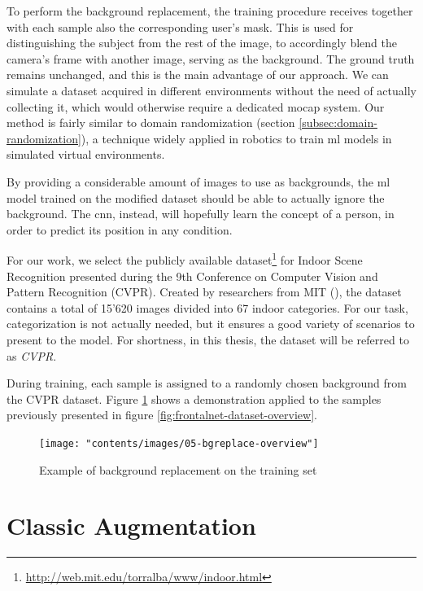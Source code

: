 To perform the background replacement, the training procedure receives together with each sample also the corresponding user's mask. This is used for distinguishing the subject from the rest of the image, to accordingly blend the camera's frame with another image, serving as the background. The ground truth remains unchanged, and this is the main advantage of our approach. We can simulate a dataset acquired in different environments without the need of actually collecting it, which would otherwise require a dedicated \gls{mocap} system. Our method is fairly similar to domain randomization (section \ref{subsec:domain-randomization}), a technique widely applied in robotics to train \gls{ml} models in simulated virtual environments.

By providing a considerable amount of images to use as backgrounds, the \gls{ml} model trained on the modified dataset should be able to actually ignore the background. The \gls{cnn}, instead, will hopefully learn the concept of a person, in order to predict its position in any condition.

\medskip

For our work, we select the publicly available dataset\footnote{\url{http://web.mit.edu/torralba/www/indoor.html}} for Indoor Scene Recognition presented during the 9th Conference on Computer Vision and Pattern Recognition (CVPR). Created by researchers from MIT (\cite{cvpr09}), the dataset contains a total of 15'620 images divided into 67 indoor categories. For our task, categorization is not actually needed, but it ensures a good variety of scenarios to present to the model. For shortness, in this thesis, the dataset will be referred to as \textit{CVPR}.

During training, each sample is assigned to a randomly chosen background from the CVPR dataset. Figure \ref{fig:bgreplace-example} shows a demonstration applied to the samples previously presented in figure \ref{fig:frontalnet-dataset-overview}. 

\begin{figure}[!h]
	\centering
	\texttt{[image: "contents/images/05-bgreplace-overview"]}
	\caption[Example of background replacement on the training set]{Example of background replacement on the training set}
	\label{fig:bgreplace-example}
\end{figure}
\clearpage




\section{Classic Augmentation}
\label{sec:implementation-imgaug}

